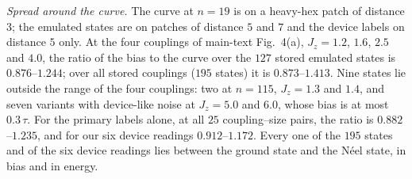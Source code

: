 \documentclass[aps,prx,onecolumn,10pt,nofootinbib,longbibliography,floatfix]{revtex4-2}
\theoremstyle{remark}
\newcommand{\Jz}{J_z}
\begin{document}
\emph{Spread around the curve.} The curve at $n=19$ is on a heavy-hex patch of distance $3$; the emulated states are %
on patches of distance $5$ and $7$ and the device labels on distance $5$ only. At the four couplings of main-text %
Fig.~4(a), $\Jz=1.2$, $1.6$, $2.5$ and $4.0$, the ratio of the bias to the curve over the $127$ stored emulated %
states is $0.876$--$1.244$; over all stored couplings ($195$ states) it is $0.873$--$1.413$. Nine states lie outside %
the range of the four couplings: two at $n=115$, $\Jz=1.3$ and $1.4$, and seven variants with device-like noise at %
$\Jz=5.0$ and $6.0$, whose bias is at most $0.3\,\tau$. For the primary labels alone, at all $25$ coupling--size %
pairs, the ratio is $0.882$--$1.235$, and for our six device readings $0.912$--$1.172$. Every one of the $195$ %
states and of the six device readings lies between the ground state and the N\'eel state, in bias and in energy.
\end{document}
